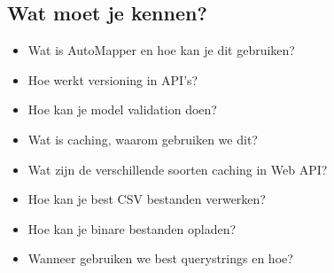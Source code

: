 \documentclass{article}
\begin{document}
\subsection{Wat moet je kennen?}

\begin{itemize}
    \item Wat is AutoMapper en hoe kan je dit gebruiken?
    \item Hoe werkt versioning in API's?
    \item Hoe kan je model validation doen?
    \item Wat is caching, waarom gebruiken we dit?
    \item Wat zijn de verschillende soorten caching in Web API?
    \item Hoe kan je best CSV bestanden verwerken?
    \item Hoe kan je binare bestanden opladen?
    \item Wanneer gebruiken we best querystrings en hoe?
\end{itemize}
\end{document}
